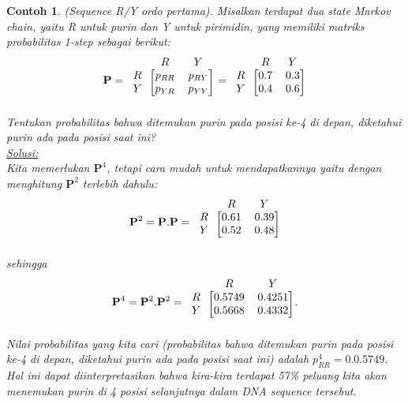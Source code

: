 \documentclass[11pt,b5paper,twoside]{book}
\newtheorem{ex}[theorem]{Contoh}
\begin{document}
	\begin{ex} \label{RYseq1} (Sequence R/Y ordo pertama).
		Misalkan terdapat dua state Markov chain, yaitu R untuk purin dan Y untuk pirimidin\footnotemark, yang memiliki matriks probabilitas 1-step sebagai berikut:
		\[
		\mathbf{P}= 
		\begin{blockarray}{l *{2}{c}}
		&R & Y \\
		\begin{block}{c[cc]}
		R& p_{RR} & p_{RY} \\
		Y& p_{YR} & p_{YY} \\
		\end{block}
		\end{blockarray} =
		\begin{blockarray}{l *{2}{c}}
		&R & Y \\
		\begin{block}{c[cc]}
		R& 0.7 & 0.3 \\
		Y& 0.4 & 0.6 \\
		\end{block}
		\end{blockarray} 
		\]
		Tentukan probabilitas bahwa ditemukan purin pada posisi ke-4 di depan, diketahui purin ada pada posisi saat ini?\\
	
		\noindent\underline{Solusi:}\\
		Kita memerlukan $\mathbf{P}^4$, tetapi cara mudah untuk mendapatkannya yaitu dengan menghitung $\mathbf{P}^2$ terlebih dahulu:
		$$
		\mathbf{P}^2 = \mathbf{P}.\mathbf{P}=
		\begin{blockarray}{l *{2}{c}}
		&R & Y \\
		\begin{block}{c[cc]}
		R& 0.61 & 0.39 \\
		Y& 0.52 & 0.48 \\
		\end{block}
		\end{blockarray} 
		$$
		sehingga
		$$
		\mathbf{P}^4 = \mathbf{P}^2.\mathbf{P}^2=
		\begin{blockarray}{l *{2}{c}}
		&R & Y \\
		\begin{block}{c[cc]}
		R& 0.5749 & 0.4251 \\
		Y& 0.5668 & 0.4332 \\
		\end{block}
		\end{blockarray}.
		$$
		Nilai probabilitas yang kita cari (probabilitas bahwa ditemukan purin pada posisi ke-4 di depan, diketahui purin ada pada posisi saat ini) adalah $p_{RR}^4 = 0.0.5749$. Hal ini dapat diinterpretasikan bahwa kira-kira terdapat 57\% peluang kita akan menemukan purin di 4 posisi selanjutnya dalam DNA sequence tersebut.
	\end{ex}
\end{document}
